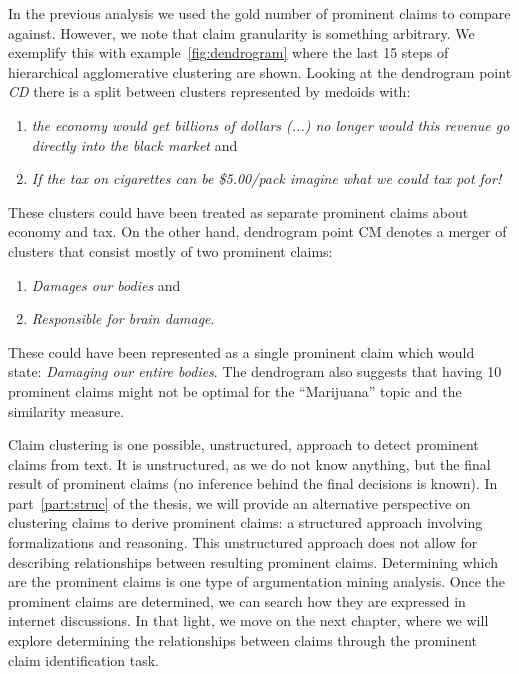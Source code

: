 In the previous analysis we used the gold number of prominent claims to compare
against. However, we note that claim granularity is something arbitrary. 
We exemplify this with example~\ref{fig:dendrogram} where the last 15 steps of
hierarchical agglomerative clustering are shown. 
Looking at the dendrogram point \emph{CD} there is a split between clusters
represented by medoids with: 
\begin{enumerate}[label=(\arabic*)]
\item \textit{the economy would get billions of dollars (...) no longer 
	would this revenue
go directly into the black market} and 
\item \textit{If the tax on cigarettes can
be \$5.00/pack imagine what we could tax pot for!}
\end{enumerate}
These clusters could have been treated as separate prominent claims about
economy and tax. 
On the other hand, dendrogram point CM denotes a merger of clusters that
consist mostly of two prominent claims: 
\begin{enumerate}[label=(\arabic*)]
\item \textit{Damages our bodies} and 
\item \textit{Responsible for brain damage}.
\end{enumerate}
These could have been represented as a single prominent claim which would state: 
\textit{Damaging our entire bodies}. 
The dendrogram also suggests that having 10 prominent claims might not be optimal 
for the ``Marijuana'' topic and the similarity measure. 

% 

Claim clustering is one possible, unstructured, approach to 
detect prominent claims from text.
It is unstructured, as we do not know anything, but the final result of
prominent claims (no inference behind the final decisions is known). In
part~\ref{part:struc} of the thesis, we will provide an
alternative perspective on clustering claims to derive prominent claims: a
structured approach involving formalizations and reasoning. This unstructured
approach does not allow for describing relationships between resulting
prominent claims. Determining which are the prominent claims is one type of 
argumentation mining analysis. Once the prominent claims are determined, we can
search how they are expressed in internet discussions. 
In that light, we move on the next chapter, where we will 
explore determining the relationships between claims through the 
prominent claim identification task. 


